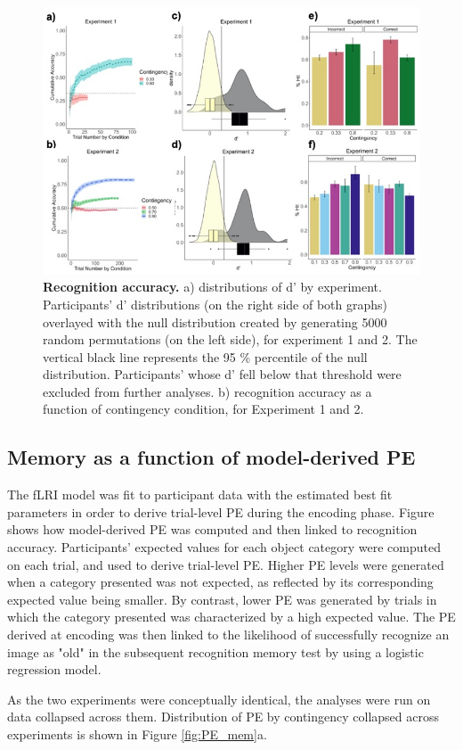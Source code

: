 \documentclass[a4paper,12pt]{article}
\begin{document}
\begin{figure}[ht!]
\centerline
{\includegraphics[width=1\textwidth]{figures/model_free_plots.jpg} }
\caption{\textbf{Recognition accuracy.} a) distributions of d' by experiment. Participants' d' distributions (on the right side of both graphs) overlayed with the null distribution created by generating 5000 random permutations (on the left side), for experiment 1 and 2. The vertical black line represents the 95 \% percentile of the null distribution. Participants' whose d' fell below that threshold were excluded from further analyses. b) recognition accuracy as a function of contingency condition, for Experiment 1 and 2.}
\label{fig:dprime}
\end{figure}



\subsection{Memory as a function of model-derived PE}
The fLRI model was fit to participant data with the estimated best fit parameters in order to derive trial-level PE during the encoding phase. Figure \label{fig:comp_mod} shows how model-derived PE was computed and then linked to recognition accuracy. Participants' expected values for each object category were computed on each trial, and used to derive trial-level PE. Higher PE levels were generated when a category presented was not expected, as reflected by its corresponding expected value being smaller. By contrast, lower PE was generated by trials in which the category presented was characterized by a high expected value. The PE derived at encoding was then linked to the likelihood of successfully recognize an image as "old" in the subsequent recognition memory test by using a logistic regression model. \par 
As the two experiments were conceptually identical, the analyses were run on data collapsed across them. Distribution of PE by contingency collapsed across experiments is shown in Figure \ref{fig:PE_mem}a. 
\end{document}
